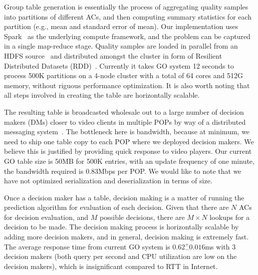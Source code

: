  Group table generation is essentially the process of aggregating quality samples into partitions of different ACs, and then computing summary statistics for each partition (e.g., mean and standard error of mean).
Our implementation uses Spark~\cite{spark} as the underlying compute framework, and the problem can be captured in a single map-reduce stage. 
Quality samples are loaded in parallel from an HDFS source~\cite{hadoop} and distributed amongst the cluster in form of Resilient Distributed Datasets (RDD)~\cite{zaharia2012resilient}. 
Currently it takes GO system 12 seconds to process 500K partitions on a 4-node cluster with a total of 64 cores and 512G memory, without riguous performance optimization.
It is also worth noting that all steps involved in creating the table are horizontally scalable.


 The resulting table is broadcasted wholesale out to a large number of decision makers (DMs) closer to video clients in multiple POPs by way of a distributed messaging system~\cite{kreps2011kafka}. The bottleneck here is bandwidth, because at minimum, we need to ship one table copy to each POP where we deployed decision makers. We believe this is justified by providing quick response to video players. Our current GO table size is 50MB for 500K entries, with an update frequency of one minute, the bandwidth required is 0.83Mbps per POP. We would like to note that we have not optimized serialization and deserialization in terms of size.

 Once a decision maker has a table, decision making is a matter of running the prediction algorithm for evaluation of each decision. Given that there are $N$ ACs for decision evaluation, and $M$ possible decisions, there are $M \times N$ lookups for a decision to be made. The decision making process is horizontally scalable by adding more decision makers, and in general, decision making is extremely fast. The average response time from current GO system is $0.62 ^{+}_{-} 0.016$ms with 3 decision makers (both query per second and CPU utilization are low on the decision makers), which is insignificant compared to RTT in Internet.

